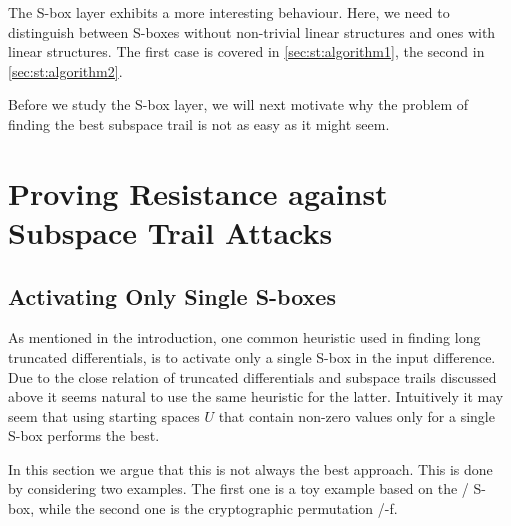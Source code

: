 The S-box layer exhibits a more interesting behaviour.
Here, we need to distinguish between S-boxes without non-trivial linear structures and ones with linear structures.
The first case is covered in \cref{sec:st:algorithm1}, the second in \cref{sec:st:algorithm2}.

Before we study the S-box layer, we will next motivate why the problem of finding the best subspace trail is not as easy as it might seem.


\section{Proving Resistance against Subspace Trail Attacks}
\subsection{Activating Only Single S-boxes}\label{st:sec:examples}

As mentioned in the introduction, one common heuristic used in finding long truncated differentials, is to activate only a single S-box in the input difference.
Due to the close relation of truncated differentials and subspace trails discussed above it seems natural to use the same heuristic for the latter.
Intuitively it may seem that using starting spaces $U$ that contain non-zero values only for a single S-box performs the best.

In this section we argue that this is not always the best approach.
This is done by considering two examples.
The first one is a toy example based on the \present/ S-box, while the second one is the cryptographic permutation \keccak/-f.

